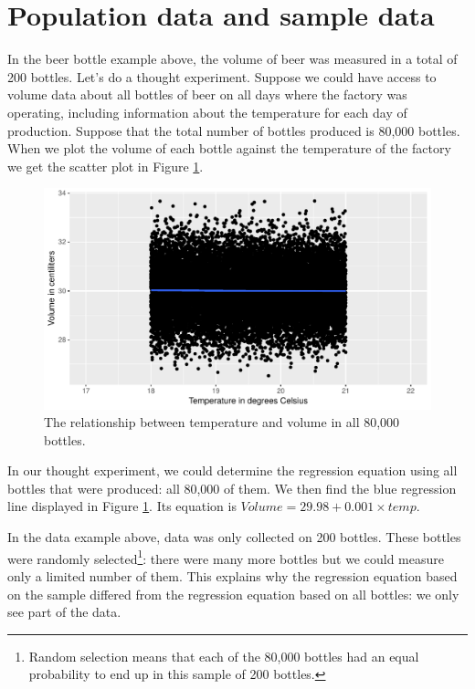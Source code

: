\documentclass[]{book}\usepackage[]{graphicx}\usepackage[]{color}
\makeatletter
\def\maxwidth{ %
  \ifdim\Gin@nat@width>\linewidth
    \linewidth
  \else
    \Gin@nat@width
  \fi
}
\newenvironment{knitrout}{}{} %
\makeatother
\begin{document}
\section{Population data and sample data}

In the beer bottle example above, the volume of beer was measured in a total of 200 bottles. Let's do a thought experiment. Suppose we could have access to volume data about all bottles of beer on all days where the factory was operating, including information about the temperature for each day of production. Suppose that the total number of bottles produced is 80,000 bottles. When we plot the volume of each bottle against the temperature of the factory we get the scatter plot in Figure \ref{fig:inf_1}.


\begin{knitrout}
\color{fgcolor}\begin{figure}

{\centering \includegraphics[width=\maxwidth]{figure/inf_1-1} 

}

\caption[The relationship between temperature and volume in all 80,000 bottles]{The relationship between temperature and volume in all 80,000 bottles.}\label{fig:inf_1}
\end{figure}


\end{knitrout}


In our thought experiment, we could determine the regression equation using all bottles that were produced: all 80,000 of them. We then find the blue regression line displayed in Figure \ref{fig:inf_1}. Its equation is $Volume = 29.98 + 0.001 \times temp$.


In the data example above, data was only collected on 200 bottles. These bottles were randomly selected\footnote{Random selection means that each of the 80,000 bottles had an equal probability to end up in this sample of 200 bottles.}: there were many more bottles but we could measure only a limited number of them. This explains why the regression equation based on the sample differed from the regression equation based on all bottles: we only see part of the data.
\end{document}

